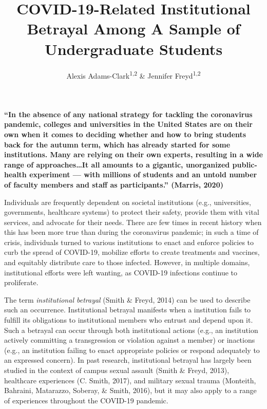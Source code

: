 \documentclass[
  english,
  man, noextraspace]{apa6}
\title{\textbf{COVID-19-Related Institutional Betrayal Among A Sample of Undergraduate Students}}
\author{Alexis Adams-Clark\textsuperscript{1,2} \& Jennifer Freyd\textsuperscript{1,2}}
\date{}
\affiliation{\vspace{0.5cm}\textsuperscript{1} University of Oregon\\\textsuperscript{2} Center for Institutional Courage}
\begin{document}
\maketitle

\raggedbottom
\centering

\textbf{\enquote{In the absence of any national strategy for tackling the coronavirus pandemic, colleges and universities in the United States are on their own when it comes to deciding whether and how to bring students back for the autumn term, which has already started for some institutions. Many are relying on their own experts, resulting in a wide range of approaches\ldots It all amounts to a gigantic, unorganized public-health experiment --- with millions of students and an untold number of faculty members and staff as participants.} (Marris, 2020)}

\raggedright

\setlength{\parindent}{5ex}

Individuals are frequently dependent on societal institutions (e.g., universities, governments, healthcare systems) to protect their safety, provide them with vital services, and advocate for their needs. There are few times in recent history when this has been more true than during the coronavirus pandemic; in such a time of crisis, individuals turned to various institutions to enact and enforce policies to curb the spread of COVID-19, mobilize efforts to create treatments and vaccines, and equitably distribute care to those infected. However, in multiple domains, institutional efforts were left wanting, as COVID-19 infections continue to proliferate.

The term \emph{institutional betrayal} (Smith \& Freyd, 2014) can be used to describe such an occurrence. Institutional betrayal manifests when a institution fails to fulfill its obligations to institutional members who entrust and depend upon it. Such a betrayal can occur through both institutional actions (e.g., an institution actively committing a transgression or violation against a member) or inactions (e.g., an institution failing to enact appropriate policies or respond adequately to an expressed concern). In past research, institutional betrayal has largely been studied in the context of campus sexual assault (Smith \& Freyd, 2013), healthcare experiences (C. Smith, 2017), and military sexual trauma (Monteith, Bahraini, Matarazzo, Soberay, \& Smith, 2016), but it may also apply to a range of experiences throughout the COVID-19 pandemic.
\end{document}
